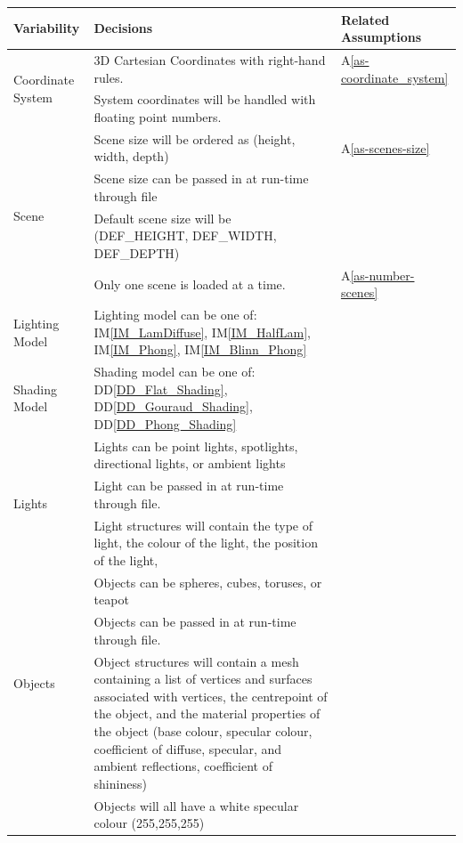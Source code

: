 \documentclass[12pt]{article}
\newcommand{\ddref}[1]{DD\ref{#1}}
\newcommand{\aref}[1]{A\ref{#1}}
\newcommand{\iref}[1]{IM\ref{#1}}
\begin{document}
\begin{table}[H]
	\begin{tabular}{|p{4cm}|p{8cm}|p{2.4cm}|}
		\hline
		\textbf{Variability} & \textbf{Decisions} & 
		\textbf{Related Assumptions}\\
		\hline
		\multirow{2}{*}{Coordinate System} & 3D Cartesian Coordinates with 
		right-hand rules. & 
		\aref{as-coordinate_system}\\ 
		& System coordinates will be handled with floating point numbers. & \\	
		\hline
		\multirow{4}{*}{Scene} & Scene size will be ordered as (height, width, 
		depth) & 
		\aref{as-scenes-size} \\
		& Scene size can be passed in at run-time through file & \\
		& Default scene size will be (DEF\_HEIGHT, DEF\_WIDTH, DEF\_DEPTH) & \\
		& Only one scene is loaded at a time. & \aref{as-number-scenes} \\
		\hline
		Lighting Model & Lighting model can be one of: \iref{IM_LamDiffuse}, 
		\iref{IM_HalfLam}, \iref{IM_Phong}, \iref{IM_Blinn_Phong} & \\
		\hline
		Shading Model & Shading model can be one of: \ddref{DD_Flat_Shading}, 
		\ddref{DD_Gouraud_Shading}, \ddref{DD_Phong_Shading} & \\
		\hline
		\multirow{3}{*}{Lights} & Lights can be point lights, spotlights, 
		directional lights, or ambient lights & \\
		& Light can be passed in at run-time through file. & \\
		& Light structures will contain the type of light, the colour of the 
		light, the position of the light,  & 
		\\
		\hline
		\multirow{3}{*}{Objects} & Objects can be spheres, cubes, toruses, or 
		teapot & \\
		& Objects can be passed in at run-time through file. & \\
		& Object structures will contain a mesh containing a list of vertices 
		and surfaces associated with vertices, the centrepoint of the object, 
		and the material properties of the object (base colour, specular 
		colour, coefficient of diffuse, specular, and ambient reflections, 
		coefficient of shininess) & \\
		& Objects will all have a white specular colour (255,255,255) & \\
		\hline
	\end{tabular}
\end{table}
\end{document}

